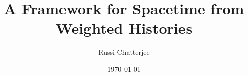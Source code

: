 \documentclass[11pt,a4paper]{article}
\title{A Framework for Spacetime from Weighted Histories}
\author{Russi Chatterjee}
\date{\today}
\theoremstyle{definition}
\theoremstyle{plain}
\theoremstyle{remark}
\begin{document}
\maketitle

\begin{abstract}
\end{abstract}










\end{document}
